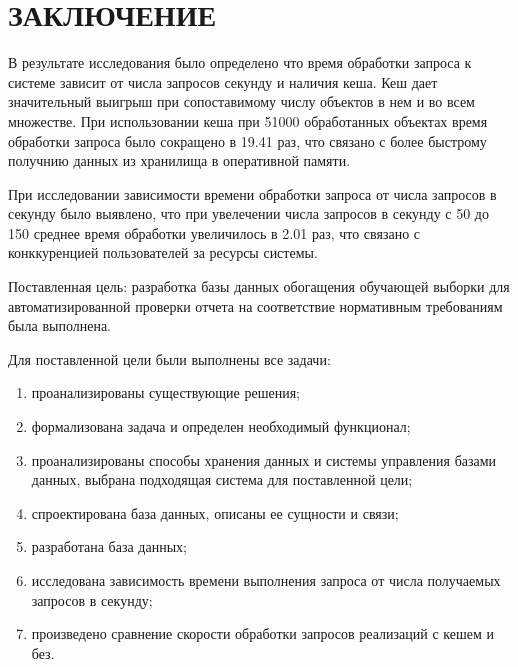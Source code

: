 \chapter*{\hfill{\centering  ЗАКЛЮЧЕНИЕ}\hfill}

В результате исследования было определено что время обработки запроса к системе зависит от числа запросов секунду и наличия кеша. Кеш дает значительный выигрыш при сопоставимому числу объектов в нем и во всем множестве. При использовании кеша при 51000 обработанных объектах время обработки запроса было сокращено в 19.41 раз, что связано с более быстрому получнию данных из хранилища в оперативной памяти.

При исследовании зависимости времени обработки запроса от числа запросов в секунду было выявлено, что при увелечении числа запросов в секунду с 50 до 150 среднее время обработки увеличилось в 2.01 раз, что связано с конккуренцией пользователей за ресурсы системы.

Поставленная цель: разработка базы данных обогащения обучающей выборки для автоматизированной проверки отчета на соответствие нормативным требованиям была выполнена.

Для поставленной цели были выполнены все задачи:
\begin{enumerate}
	\item проанализированы существующие решения;
	\item формализована задача и определен необходимый функционал;
	\item проанализированы способы хранения данных и системы управления базами данных, выбрана подходящая система для поставленной цели;
	\item спроектирована база данных, описаны ее сущности и связи;
	\item разработана база данных;
	\item исследована зависимость времени выполнения запроса от числа получаемых запросов в секунду;
	\item произведено сравнение скорости обработки запросов реализаций с кешем и без.
\end{enumerate}
